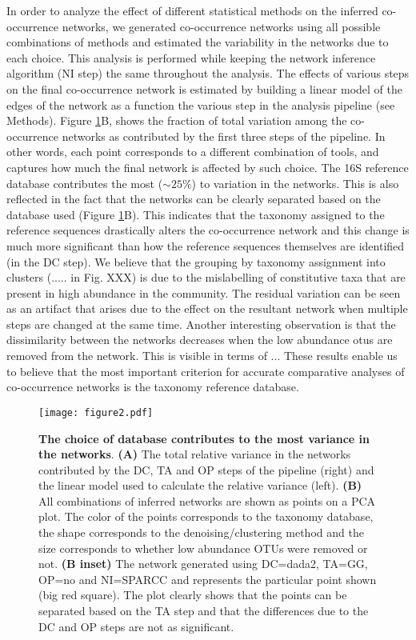   In order to analyze the effect of different statistical methods on the inferred co-occurrence networks, we generated co-occurrence networks using all possible combinations of methods and estimated the variability in the networks due to each choice.
  This analysis is performed while keeping the network inference algorithm (NI step) the same throughout the analysis.
  The effects of various steps on the final co-occurrence network is estimated by building a linear model of the edges of the network as a function the various step in the analysis pipeline (see Methods).
  Figure \ref{fig:figure2}B, shows the fraction of total variation among the co-occurrence networks as contributed by the first three steps of the pipeline. In other words, each point corresponds to a different combination of tools, and captures how much the final network is affected by such choice.
  The 16S reference database contributes the most ($\sim25\%$) to variation in the networks. This is also reflected in the fact that the networks can be clearly separated based on the database used (Figure \ref{fig:figure2}B).
  This indicates that the taxonomy assigned to the reference sequences drastically alters the co-occurrence network and this change is much more significant than how the reference sequences themselves are identified (in the DC step).
  We believe that the grouping by taxonomy assignment into clusters (..... in Fig. XXX) is due to the mislabelling of constitutive taxa that are present in high abundance in the community.
  The residual variation can be seen as an artifact that arises due to the effect on the resultant network when multiple steps are changed at the same time.
  Another interesting observation is that the dissimilarity between the networks decreases when the low abundance \ac{otu}s are removed from the network. This is visible in terms of ...
  These results enable us to believe that the most important criterion for accurate comparative analyses of co-occurrence networks is the taxonomy reference database.

  \begin{figure}[H]
    \centering
    \texttt{[image: figure2.pdf]}
  \end{figure}
  \begin{figure}[!t]
    \centering
      \caption{
      \textbf{The choice of database contributes to the most variance in the networks}.
      \textbf{(A)} The total relative variance in the networks contributed by the DC, TA and OP steps of the pipeline (right) and the linear model used to calculate the relative variance (left).
      \textbf{(B)} All combinations of inferred networks are shown as points on a PCA plot.
      The color of the points corresponds to the taxonomy database, the shape corresponds to the denoising/clustering method and the size corresponds to whether low abundance OTUs were removed or not.
      \textbf{(B inset)} The network generated using DC=dada2, TA=GG, OP=no and NI=SPARCC and represents the particular point shown (big red square).
      The plot clearly shows that the points can be separated based on the TA step and that the differences due to the DC and OP steps are not as significant.
    }
    \label{fig:figure2}
  \end{figure}


